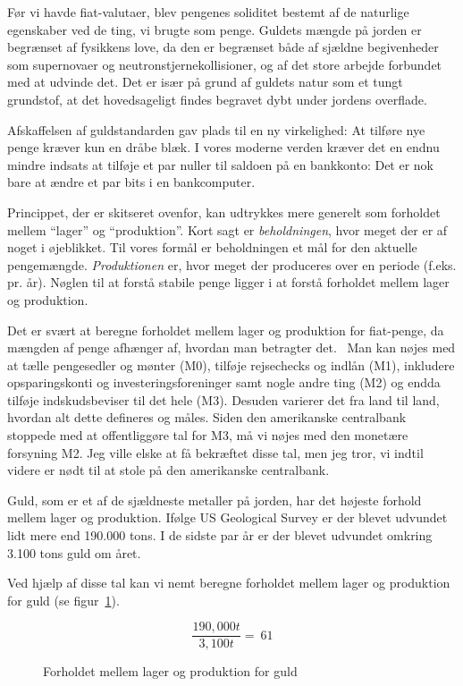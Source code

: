 \documentclass[paper=6in:9in,pagesize=pdftex,
               headinclude=on,footinclude=on,12pt]{scrbook}
\begin{document}
Før vi havde fiat-valutaer, blev pengenes soliditet bestemt af de naturlige egenskaber ved de ting, vi brugte som penge. Guldets mængde på jorden er begrænset af fysikkens love, da den er begrænset både af sjældne begivenheder som supernovaer og neutronstjernekollisioner, og af det store arbejde forbundet med at udvinde det. Det er især på grund af guldets natur som et tungt grundstof, at det hovedsageligt findes begravet dybt under jordens overflade.

Afskaffelsen af guldstandarden gav plads til en ny virkelighed: At tilføre nye penge kræver kun en dråbe blæk. I vores moderne verden kræver det en endnu mindre indsats at tilføje et par nuller til saldoen på en bankkonto: Det er nok bare at ændre et par bits i en bankcomputer.

Princippet, der er skitseret ovenfor, kan udtrykkes mere generelt som forholdet mellem \enquote{lager} og \enquote{produktion}. Kort sagt er \textit{beholdningen}, hvor meget der er af noget i øjeblikket. Til vores formål er beholdningen et mål for den aktuelle pengemængde. \textit{Produktionen} er, hvor meget der produceres over en periode (f.eks. pr. år). Nøglen til at forstå stabile penge ligger i at forstå forholdet mellem lager og produktion.

Det er svært at beregne forholdet mellem lager og produktion for fiat-penge, da mængden af penge afhænger af, hvordan man betragter det.~\cite{wiki:money-supply} Man kan nøjes med at tælle pengesedler og mønter (M0), tilføje rejsechecks og indlån (M1), inkludere opsparingskonti og investeringsforeninger samt nogle andre ting (M2) og endda tilføje indskudsbeviser til det hele (M3). Desuden varierer det fra land til land, hvordan alt dette defineres og måles. Siden den amerikanske centralbank stoppede med at offentliggøre \cite{web:fed-m3} tal for M3, må vi nøjes med den monetære forsyning M2. Jeg ville elske at få bekræftet disse tal, men jeg tror, vi indtil videre er nødt til at stole på den amerikanske centralbank.

Guld, som er et af de sjældneste metaller på jorden, har det højeste forhold mellem lager og produktion. Ifølge US Geological Survey er der blevet udvundet lidt mere end 190.000 tons. I de sidste par år er der blevet udvundet omkring 3.100 tons guld om året.~\cite{mineral-commodity-summaries}

Ved hjælp af disse tal kan vi nemt beregne forholdet mellem lager og produktion for guld (se figur~\ref{fig:stock-to-flow-gold}).

\begin{figure}
  \centering
  \begin{equation}
  \frac{190,000 t}{3,100 t} = ~ 61
  \end{equation}
  \caption{Forholdet mellem lager og produktion for guld}
  \label{fig:stock-to-flow-gold}
\end{figure}
\end{document}
